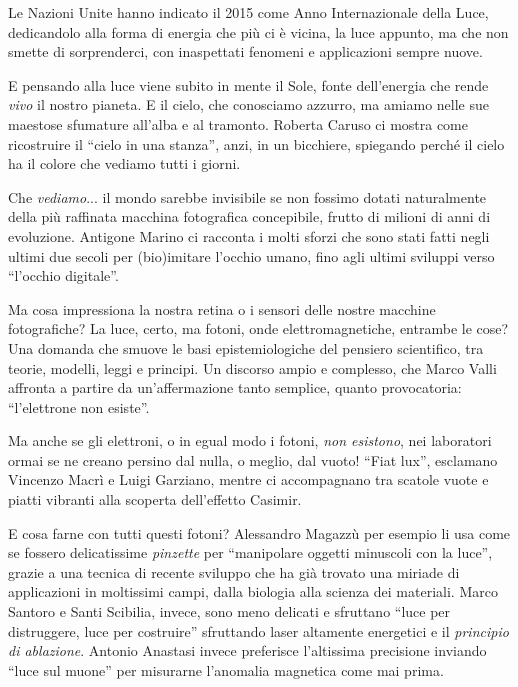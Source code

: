Le Nazioni Unite hanno indicato il 2015 come Anno Internazionale della Luce, dedicandolo alla forma di energia che più ci è vicina, la luce appunto,
ma che non smette di sorprenderci, con inaspettati fenomeni e applicazioni sempre nuove.

\smallskip
E pensando alla luce viene subito in mente il Sole, fonte dell'energia che rende \emph{vivo} il nostro pianeta. E il cielo, che conosciamo azzurro, ma amiamo nelle sue maestose sfumature
all'alba e al tramonto. Roberta Caruso ci mostra come ricostruire il ``cielo in una stanza'', anzi, in un bicchiere, spiegando perché il cielo ha il colore che vediamo tutti i giorni.

\smallskip
Che \emph{vediamo}... il mondo sarebbe invisibile se non fossimo dotati naturalmente della più raffinata macchina fotografica concepibile, frutto di milioni di anni di evoluzione.
Antigone Marino ci racconta i molti sforzi che sono stati fatti negli ultimi due secoli per (bio)imitare l'occhio umano, fino agli ultimi sviluppi verso ``l'occhio digitale''.

\smallskip
Ma cosa impressiona la nostra retina o i sensori delle nostre macchine fotografiche? La luce, certo, ma fotoni, onde elettromagnetiche, entrambe le cose? Una domanda che smuove le basi
epistemiologiche del pensiero scientifico, tra teorie, modelli, leggi e principi. Un discorso ampio e complesso, che Marco Valli affronta a partire da un'affermazione tanto semplice, quanto provocatoria:
``l'elettrone non esiste''.

\smallskip
Ma anche se gli elettroni, o in egual modo i fotoni, \emph{non esistono}, nei laboratori ormai se ne creano persino dal nulla, o meglio, dal vuoto! ``Fiat lux'', esclamano Vincenzo Macrì e
Luigi Garziano, mentre ci accompagnano tra scatole vuote e piatti vibranti alla scoperta dell'effetto Casimir.

\smallskip
E cosa farne con tutti questi fotoni? Alessandro Magazzù per esempio li usa come se fossero delicatissime \emph{pinzette} per ``manipolare oggetti minuscoli con la luce'', grazie a una tecnica di recente sviluppo
che ha già trovato una miriade di applicazioni in moltissimi campi, dalla biologia alla scienza dei materiali. Marco Santoro e Santi Scibilia, invece, sono meno delicati e sfruttano ``luce per distruggere,
luce per costruire'' sfruttando laser altamente energetici e il \emph{principio di ablazione}. Antonio Anastasi invece preferisce l'altissima precisione inviando ``luce sul muone''
per misurarne l'anomalia magnetica come mai prima.

